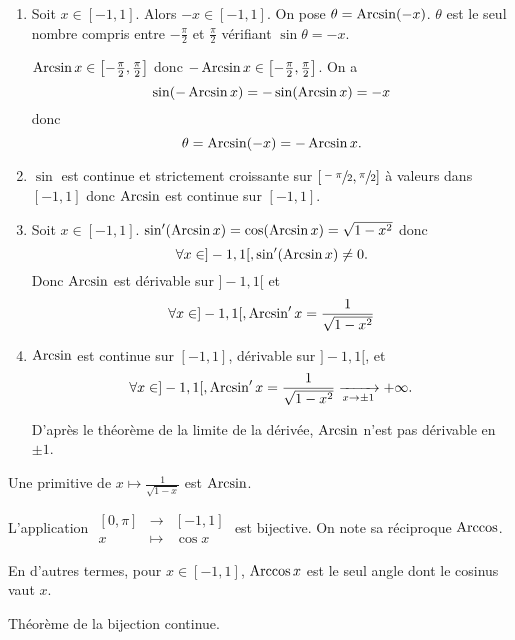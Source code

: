 \begin{prv}
	\begin{enumerate}
		\item Soit $x \in [-1, 1]$. Alors $-x \in [-1, 1]$. On pose $\theta = \operatorname{Arcsin}(-x)$. $\theta$ est le seul nombre compris entre $-\frac{\pi}{2}$ et $\frac{\pi}{2}$ vérifiant $\sin \theta = -x$.

			$\operatorname{Arcsin} x \in \left[ -\frac{\pi}{2}, \frac{\pi}{2} \right]$ donc $-\operatorname{Arcsin} x \in \left[ -\frac{\pi}{2}, \frac{\pi}{2} \right]$. On a \[
				\sin(-\operatorname{Arcsin} x) = -\sin(\operatorname{Arcsin} x) = -x
			\] donc \[
				\theta = \operatorname{Arcsin}(-x) = -\operatorname{Arcsin} x.
			\]
		\item $\sin$ est continue et strictement croissante sur $[\sfrac{-\pi}{2}, \sfrac{\pi}{2}]$ à valeurs dans $[-1, 1]$ donc $\operatorname{Arcsin}$ est continue sur $[-1, 1]$.
		\item Soit $x \in [-1, 1]$. $\sin'(\operatorname{Arcsin} x) = \cos(\operatorname{Arcsin} x) = \sqrt{1-x^2}$ donc \[
				\forall x \in ]-1,1[, \sin'(\operatorname{Arcsin} x) \neq 0.
			\] Donc $\operatorname{Arcsin}$ est dérivable sur $]-1, 1[$ et \[
				\forall x \in ]-1, 1[, \operatorname{Arcsin}' x = \frac{1}{\sqrt{1-x^2}}
			\]
		\item $\operatorname{Arcsin}$ est continue sur $[-1, 1]$, dérivable sur $]-1,1[$, et \[
			\forall x \in ]-1, 1[, \operatorname{Arcsin}' x = \frac{1}{\sqrt{1-x^2}}
			\xrightarrow[x\to \pm 1]{} +\infty.
		\]
		
		D'après le théorème de la limite de la dérivée, $\operatorname{Arcsin}$ n'est pas dérivable en $\pm 1$.
	\end{enumerate}
\end{prv}

\begin{rmk}
	Une primitive de $x \mapsto \frac{1}{\sqrt{1-x}}$ est $\operatorname{Arcsin}$.
\end{rmk}

\begin{prop-defn}
	L'application $\begin{array}{rcl}
		[0,\pi] &\longrightarrow& [-1,1] \\
		x &\longmapsto& \cos x
	\end{array}$ est bijective. On note sa réciproque $\operatorname{Arccos}$.

	En d'autres termes, pour $x \in [-1, 1]$, $\operatorname{Arccos} x$ est le seul angle  dont le cosinus vaut $x$.
\end{prop-defn}

\begin{prv}
	Théorème de la bijection continue.
\end{prv}

